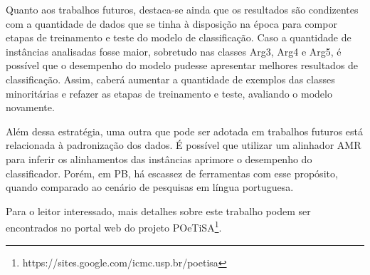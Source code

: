 Quanto aos trabalhos futuros, destaca-se ainda que os resultados são
condizentes com a quantidade de dados que se tinha à disposição na época
para compor etapas de treinamento e teste do modelo de classificação.
Caso a quantidade de instâncias analisadas fosse maior, sobretudo nas
classes Arg3, Arg4 e Arg5, é possível que o desempenho do modelo pudesse
apresentar melhores resultados de classificação. Assim, caberá aumentar
a quantidade de exemplos das classes minoritárias e refazer as etapas de
treinamento e teste, avaliando o modelo novamente.

Além dessa estratégia, uma outra que pode ser adotada em trabalhos
futuros está relacionada à padronização dos dados. É possível que
utilizar um alinhador AMR para inferir os alinhamentos das instâncias
aprimore o desempenho do classificador. Porém, em PB, há escassez de
ferramentas com esse propósito, quando comparado ao cenário de pesquisas
em língua portuguesa.

Para o leitor interessado, mais detalhes sobre este trabalho podem ser
encontrados no portal web do projeto POeTiSA\footnote{https://sites.google.com/icmc.usp.br/poetisa}.

